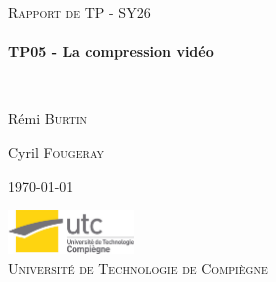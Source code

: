 \begin{titlepage}
\begin{center}



\textsc{\Large Rapport de TP - SY26}\\[0.5cm]
\vspace{4cm}
\HRule \\[0.4cm]
{ \huge \bfseries TP05 - La compression vidéo \\[0.4cm] }

\HRule \\[1.5cm]

\begin{minipage}{0.4\textwidth}
\begin{flushleft} \large
R\'emi \textsc{Burtin}
\end{flushleft}
\end{minipage}
\begin{minipage}{0.4\textwidth}
\begin{flushright} \large
Cyril \textsc{Fougeray}
\end{flushright}
\end{minipage}

\vspace{4cm}

{\large \today}



\vfill
\includegraphics[width=0.25\textwidth]{logo.jpg}\\[0.5cm]

\textsc{\LARGE Universit\'{e} de Technologie de Compi\`{e}gne}\\[1.5cm]


\end{center}
\end{titlepage}
